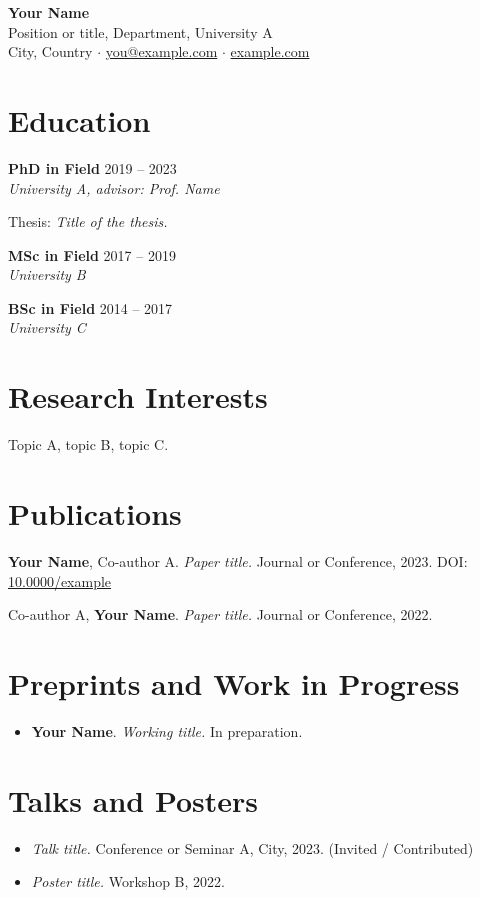 \documentclass[11pt,a4paper]{article}
\newcommand{\entry}[3]{\textbf{#1} \hfill #3\\ \textit{#2}\par\smallskip}
\begin{document}
{\LARGE\bfseries Your Name}\\[2pt]
Position or title, Department, University A \\
City, Country \quad $\cdot$ \quad \href{mailto:you@example.com}{you@example.com} \quad $\cdot$ \quad \href{https://example.com}{example.com}

\section{Education}
\entry{PhD in Field}{University A, advisor: Prof. Name}{2019 -- 2023}
Thesis: \textit{Title of the thesis.}

\entry{MSc in Field}{University B}{2017 -- 2019}
\entry{BSc in Field}{University C}{2014 -- 2017}

\section{Research Interests}
Topic A, topic B, topic C.

\section{Publications}
\begin{enumerate}[label={[\arabic*]}]
  \item \textbf{Your Name}, Co-author A. \textit{Paper title.} Journal or Conference, 2023. DOI: \href{https://doi.org/10.0000/example}{10.0000/example}
  \item Co-author A, \textbf{Your Name}. \textit{Paper title.} Journal or Conference, 2022.
\end{enumerate}

\section{Preprints and Work in Progress}
\begin{itemize}
  \item \textbf{Your Name}. \textit{Working title.} In preparation.
\end{itemize}

\section{Talks and Posters}
\begin{itemize}
  \item \textit{Talk title.} Conference or Seminar A, City, 2023. (Invited / Contributed)
  \item \textit{Poster title.} Workshop B, 2022.
\end{itemize}
\end{document}
